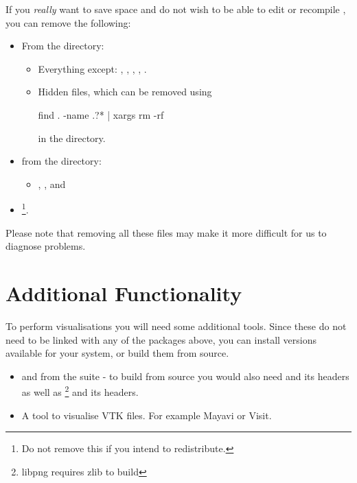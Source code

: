 If you \emph{really} want to save space and do not wish to be able to edit or recompile \esfinley, you can remove the following:
\begin{itemize}
 \item From the  directory:\begin{itemize}
\item Everything except: , , , ,
.
\item Hidden files, which can be removed using
\begin{shellCode}
find . -name .?* | xargs rm -rf
\end{shellCode}
in the  directory.
\end{itemize}
\item from the  directory:
\begin{itemize}
\item  {}, ,  and 
\end{itemize}
\item {}\footnote{Do not remove this if you intend to redistribute.}.
\end{itemize}

Please note that removing all these files may make it more difficult for us to diagnose problems.


\section{Additional Functionality}\label{sec:linaddfunc}
To perform visualisations you will need some additional tools.
Since these do not need to be linked with any of the packages above, you can install versions available for your system, or build them from source.
\begin{itemize}
\item {} and  from the  suite - to build from source 
you would also need  and its headers as well as \footnote{libpng requires zlib to build} and its headers.
\item A tool to visualise VTK files. For example Mayavi or Visit.
\end{itemize}

